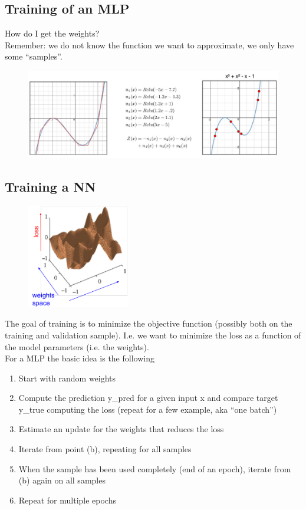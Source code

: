 \subsection{Training of an MLP}
How do I get the weights?\\
Remember: we do not know the function we want to approximate, we only have some “samples”.

\begin{figure}[ht]
	\centering
	\includegraphics[width=0.9\linewidth]{figure_ml/training_mlp.png}
\end{figure}
\FloatBarrier

\subsection{Training a NN}


\begin{figure}
	\includegraphics[width=0.4\textwidth]{figure_ml/training_nn.png}
\end{figure} 

The goal of training is to minimize the objective
function (possibly both on the training and validation
sample). I.e. we want to minimize the loss as a function of the model parameters (i.e. the weights).\\
For a MLP the basic idea is the following


\begin{enumerate}
	\item Start with random weights
	\item Compute the prediction y\_pred for a given input x and compare target y\_true computing the loss (repeat for a few example, aka “one batch”)
	\item Estimate an update for the weights that reduces the loss
	\item Iterate from point (b), repeating for all samples
	\item When the sample has been used completely (end of an epoch), iterate from (b) again on all samples
	\item Repeat for multiple epochs
\end{enumerate}


